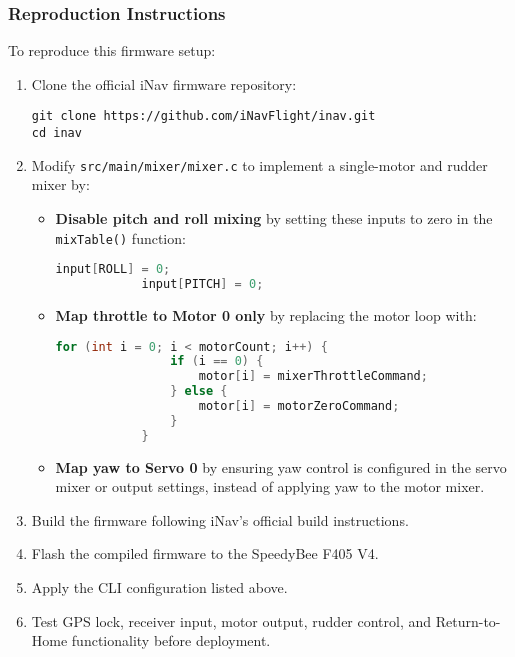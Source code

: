 \subsubsection*{Reproduction Instructions}

To reproduce this firmware setup:

\begin{enumerate}
    \item Clone the official iNav firmware repository:
    \begin{lstlisting}
git clone https://github.com/iNavFlight/inav.git
cd inav
    \end{lstlisting}

    
    \item Modify \texttt{src/main/mixer/mixer.c} to implement a single-motor and rudder mixer by:
    \begin{itemize}
        \item \textbf{Disable pitch and roll mixing} by setting these inputs to zero in the \texttt{mixTable()} function:
        \begin{lstlisting}[language=C]
            input[ROLL] = 0;
            input[PITCH] = 0;
        \end{lstlisting}

        \item \textbf{Map throttle to Motor 0 only} by replacing the motor loop with:
        \begin{lstlisting}[language=C]
            for (int i = 0; i < motorCount; i++) {
                if (i == 0) {
                    motor[i] = mixerThrottleCommand;
                } else {
                    motor[i] = motorZeroCommand;
                }
            }
        \end{lstlisting}

        \item \textbf{Map yaw to Servo 0} by ensuring yaw control is configured in the servo mixer or output settings, instead of applying yaw to the motor mixer.
    \end{itemize}


    \item Build the firmware following iNav's official build instructions.

    \item Flash the compiled firmware to the SpeedyBee F405 V4.

    \item Apply the CLI configuration listed above.

    \item Test GPS lock, receiver input, motor output, rudder control, and Return-to-Home functionality before deployment.
\end{enumerate}

